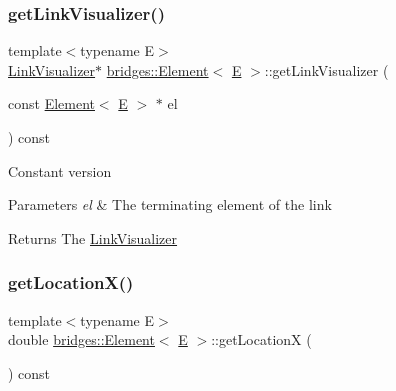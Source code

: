 \subsubsection{\texorpdfstring{getLinkVisualizer()}{getLinkVisualizer()}\hspace{0.1cm}{\footnotesize\ttfamily [2/2]}}
{\footnotesize\ttfamily template$<$typename E$>$ \\
\mbox{\hyperlink{classbridges_1_1_link_visualizer}{Link\+Visualizer}}$\ast$ \mbox{\hyperlink{classbridges_1_1_element}{bridges\+::\+Element}}$<$ \mbox{\hyperlink{namespacebridges_acfb0a4f7877d8f63de3e6862004c50eda3a3ea00cfc35332cedf6e5e9a32e94da}{E}} $>$\+::get\+Link\+Visualizer (\begin{DoxyParamCaption}\item[{const \mbox{\hyperlink{classbridges_1_1_element}{Element}}$<$ \mbox{\hyperlink{namespacebridges_acfb0a4f7877d8f63de3e6862004c50eda3a3ea00cfc35332cedf6e5e9a32e94da}{E}} $>$ $\ast$}]{el }\end{DoxyParamCaption}) const\hspace{0.3cm}{\ttfamily [inline]}}

Constant version


\begin{DoxyParams}{Parameters}
{\em el} & The terminating element of the link \\
\hline
\end{DoxyParams}
\begin{DoxyReturn}{Returns}
The \mbox{\hyperlink{classbridges_1_1_link_visualizer}{Link\+Visualizer}} 
\end{DoxyReturn}
\mbox{\label{classbridges_1_1_element_a3b6eae6e2ed5c9d74b9858f23d47e878}} 
\subsubsection{\texorpdfstring{getLocationX()}{getLocationX()}}
{\footnotesize\ttfamily template$<$typename E$>$ \\
double \mbox{\hyperlink{classbridges_1_1_element}{bridges\+::\+Element}}$<$ \mbox{\hyperlink{namespacebridges_acfb0a4f7877d8f63de3e6862004c50eda3a3ea00cfc35332cedf6e5e9a32e94da}{E}} $>$\+::get\+LocationX (\begin{DoxyParamCaption}{ }\end{DoxyParamCaption}) const\hspace{0.3cm}{\ttfamily [inline]}}

